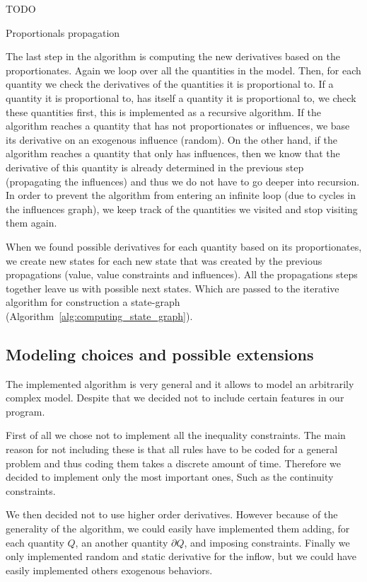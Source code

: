 \documentclass[a4paper]{article}
\begin{document}
\vspace{12pt}
\begin{algorithm}[H]
	TODO
	\caption{Proportionals propagation}
	\label{alg:propogating_proportionals}
\end{algorithm}
\vspace{12pt}

The last step in the algorithm is computing the new derivatives based on the proportionates. Again we loop over all the quantities in the model. Then, for each quantity we check the derivatives of the quantities it is proportional to. If a quantity it is proportional to, has itself a quantity it is proportional to, we check these quantities first, this is implemented as a recursive algorithm. If the algorithm reaches a quantity that has not proportionates or influences, we base its derivative on an exogenous influence (random). On the other hand, if the algorithm reaches a quantity that only has influences, then we know that the derivative of this quantity is already determined in the previous step (propagating the influences) and thus we do not have to go deeper into recursion. In order to prevent the algorithm from entering an infinite loop (due to cycles in the influences graph), we keep track of the quantities we visited and stop visiting them again.

When we found possible derivatives for each quantity based on its proportionates, we create new states for each new state that was created by the previous propagations (value, value constraints and influences). All the propagations steps together leave us with possible next states. Which are passed to the iterative algorithm for construction a state-graph (Algorithm~\ref{alg:computing_state_graph}).

\subsection{Modeling choices and possible extensions}
The implemented algorithm is very general and it allows to model an arbitrarily complex model. Despite that we decided not to include certain features in our program.

First of all we chose not to implement all the inequality constraints. The main reason for not including these is that all rules have to be coded for a general problem and thus coding them takes a discrete amount of time. Therefore we decided to implement only the most important ones, Such as the continuity constraints.

We then decided not to use higher order derivatives. However because of the generality of the algorithm, we could easily have implemented them adding, for each quantity $Q$, an another quantity $\partial Q$, and imposing constraints.
Finally we only implemented random and static derivative for the inflow, but we could have easily implemented others exogenous behaviors.
\end{document}
